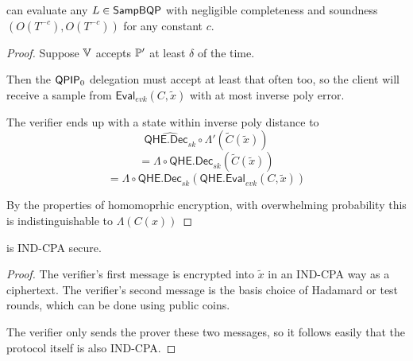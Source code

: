 \begin{thm}
    \label{QPIP1thm}
	 can evaluate any $L\in\operatorname{\mathsf{SampBQP}}$ with negligible completeness and soundness $(O(T^{-c}), O(T^{-c}))$ for any constant $c$.
\end{thm}
\begin{proof}
	Suppose $\mathbb{V}$ accepts $\mathbb{P}'$ at least $\delta$ of the time.

	Then the $\operatorname{\mathsf{QPIP}}_0$ delegation must accept at least that often too,
	so the client will receive a sample from $\mathsf{Eval}_{evk}(C, \tilde{x})$ with at most inverse poly error. 

	The verifier ends up with a state within inverse poly distance to
		$$\widehat{\mathsf{QHE.Dec}_{sk}}\circ\Lambda'(\tilde{C}(\tilde{x}))$$
		$$=\Lambda\circ\mathsf{QHE.Dec}_{sk}(\tilde{C}(\tilde{x}))$$
		$$=\Lambda\circ\mathsf{QHE.Dec}_{sk}(\mathsf{QHE.Eval}_{evk}(C, \tilde{x}))$$

	By the properties of homomoprhic encryption, with overwhelming probability this is indistinguishable to  $\Lambda(C(x))$
\end{proof}

\begin{thm}
	 is IND-CPA secure.
\end{thm}
\begin{proof}
	The verifier's first message is encrypted into $\tilde{x}$ in an IND-CPA way as a ciphertext.
	The verifier's second message is the basis choice of Hadamard or test rounds, which can be done using public coins.

	The verifier only sends the prover these two messages, so it follows  easily that the protocol itself is also IND-CPA. 
\end{proof}
